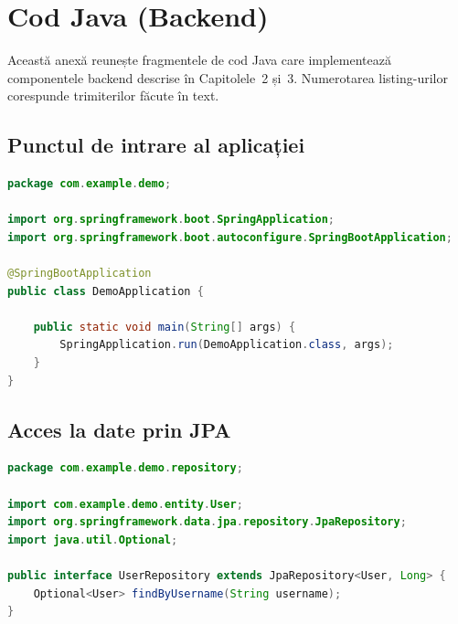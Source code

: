 
\appendix
\chapter{Cod Java (Backend)}
\label{anexa:java}

Această anexă reunește fragmentele de cod Java care implementează componentele
backend descrise în Capitolele~2 și~3. Numerotarea listing-urilor corespunde
trimiterilor făcute în text.

\section*{Punctul de intrare al aplicației}

\begin{lstlisting}[language=Java, caption={Clasa principală a aplicației Spring Boot}, label={lst:a1}]
package com.example.demo;

import org.springframework.boot.SpringApplication;
import org.springframework.boot.autoconfigure.SpringBootApplication;

@SpringBootApplication
public class DemoApplication {

    public static void main(String[] args) {
        SpringApplication.run(DemoApplication.class, args);
    }
}
\end{lstlisting}

\section*{Acces la date prin JPA}

\begin{lstlisting}[language=Java, caption={Interfata de acces la date pentru utilizatori}, label={lst:a2}]
package com.example.demo.repository;

import com.example.demo.entity.User;
import org.springframework.data.jpa.repository.JpaRepository;
import java.util.Optional;

public interface UserRepository extends JpaRepository<User, Long> {
    Optional<User> findByUsername(String username);
}
\end{lstlisting}

